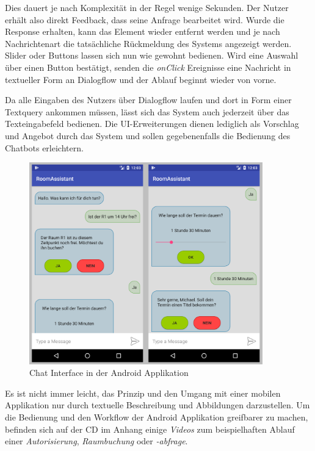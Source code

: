 Dies dauert je nach Komplexität in der Regel wenige Sekunden. Der Nutzer erhält also direkt Feedback, dass seine Anfrage bearbeitet wird. Wurde die Response erhalten, kann das Element wieder entfernt werden und je nach Nachrichtenart die tatsächliche Rückmeldung des Systems angezeigt werden. Slider oder Buttons lassen sich nun wie gewohnt bedienen. Wird eine Auswahl über einen Button bestätigt, senden die \textit{onClick} Ereignisse eine Nachricht in textueller Form an Dialogflow und der Ablauf beginnt wieder von vorne. 

Da alle Eingaben des Nutzers über Dialogflow laufen und dort in Form einer \mbox{Textquery} ankommen müssen, lässt sich das System auch jederzeit über das Texteingabefeld bedienen. Die \ac{UI}-Erweiterungen dienen lediglich als Vorschlag und Angebot durch das System und sollen gegebenenfalls die Bedienung des Chatbots erleichtern.
\newline

\begin{figure}[H]
    \centering
    \includegraphics[width=0.9\textwidth]{bilder/ChatInterfaceCombined.png}
    \caption{Chat Interface in der Android Applikation}
    \label{fig:android-chat-interface-screen}
\end{figure}

Es ist nicht immer leicht, das Prinzip und den Umgang mit einer mobilen Applikation nur durch textuelle Beschreibung und Abbildungen darzustellen. Um die Bedienung und den Workflow der Android Applikation greifbarer zu machen, befinden sich auf der CD im Anhang einige \textit{Videos} zum beispielhaften Ablauf einer \textit{Autorisierung}, \textit{Raumbuchung} oder \textit{-abfrage}.



